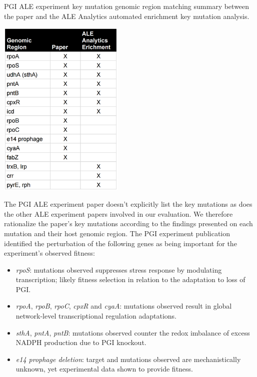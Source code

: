 \documentclass[12pt,final,masters,chapterheads]{ucsd}  %
\begin{document}
\begin{table}[H]
  \centering
  \caption{PGI ALE experiment key mutation genomic region matching summary between the paper and the ALE Analytics automated enrichment key mutation analysis.}
  \includegraphics[width=0.45\textwidth]{pgi_key_mutation_regions.png}
\end{table}
The PGI ALE experiment paper doesn't explicitly list the key mutations as does the other ALE experiment papers involved in our evaluation. We therefore rationalize the paper's key mutations according to the findings presented on each mutation and their host genomic region. The PGI experiment publication identified the perturbation of the following genes as being important for the experiment's observed fitness:
\begin{itemize}
\item \textit{rpoS}: mutations observed suppresses stress response by modulating transcription; likely fitness selection in relation to the adaptation to loss of PGI.
\item \textit{rpoA}, \textit{rpoB}, \textit{rpoC}, \textit{cpxR} and \textit{cyaA}: mutations observed result in global network-level transcriptional regulation adaptations.
\item \textit{sthA}, \textit{pntA}, \textit{pntB}: mutations observed counter the redox imbalance of excess NADPH production due to PGI knockout.
\item \textit{e14 prophage deletion}: target and mutations observed are mechanistically unknown, yet experimental data shown to provide fitness.
\end{itemize}
\end{document}
